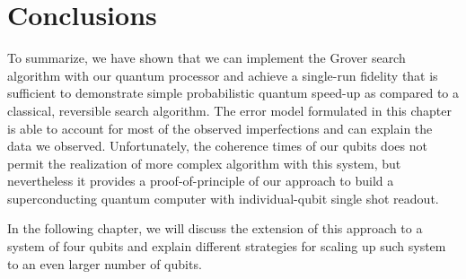 \section{Conclusions}

To summarize, we have shown that we can implement the Grover search algorithm with our quantum processor and achieve a single-run fidelity that is sufficient to demonstrate simple probabilistic quantum speed-up as compared to a classical, reversible search algorithm. The error model formulated in this chapter is able to account for most of the observed imperfections and can explain the data we observed. Unfortunately, the coherence times of our qubits does not permit the realization of more complex algorithm with this system, but nevertheless it provides a proof-of-principle of our approach to build a superconducting quantum computer with individual-qubit single shot readout.

\smallskip

In the following chapter, we will discuss the extension of this approach to a system of four qubits and explain different strategies for scaling up such system to an even larger number of qubits.

